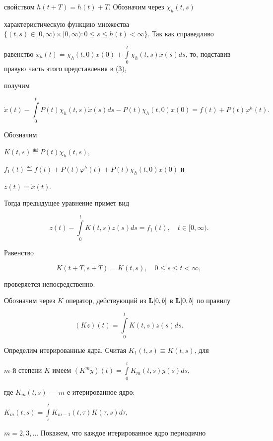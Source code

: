 свойством $h(t+T)=h(t)+T$. Обозначим через ${\chi}_h(t,s)$


характеристическую функцию множества $\{(t,s)\in [0,\infty )\times


[0,\infty ):0\le s\le h(t)< \infty \}$. Так как справедливо


равенство $x_h(t)={\chi_h}(t,0)x(0)+\int\limits_0^t{\chi}_h(t,s){\Dot


x}(s)ds$, то, подставив правую часть этого представления в (3),


получим


$$


{\Dot x}(t)-\int\limits_0^tP(t){\chi}_h(t,s){\Dot


x}(s)ds-P(t){\chi}_h(t,0)x(0)= f(t)+P(t){\varphi}^h(t).


$$


Обозначим


$K(t,s)\eqdef P(t){\chi}_h(t,s)$,


$f_1(t)\eqdef f(t)+P(t){\varphi}^h(t)+P(t){\chi}_h(t,0)x(0)$ и


$z(t)={\Dot x}(t)$.


Тогда предыдущее уравнение примет вид


$$


z(t)-\int\limits_0^tK(t,s)z(s)ds=f_1(t),\quad t\in [0,{\infty}).


$$


Равенство


$$


K(t+T,s+T)=K(t,s),\quad 0\le s\le t<{\infty},


$$


проверяется непосредственно.





Обозначим через $K$ оператор, действующий из ${\spc L}[0,b]$ в ${\spc


L}[0,b]$ по правилу


$$


(Kz)(t)=\int\limits_0^tK(t,s)z(s)ds.


$$


Определим итерированные ядра. Считая $K_1(t,s)\equiv K(t,s)$, для


$m$-й степени $K$ имеем $(K^my)(t)=\int\limits_0^tK_m(t,s)y(s)ds$,


где $K_m(t,s)$ --- $m$-е итерированное ядро:


$K_m(t,s)=\int\limits_s^tK_{m-1}(t,\tau)K(\tau,s)d\tau$,


$m=2,3,\dotsc$\; Покажем, что каждое итерированное ядро периодично


